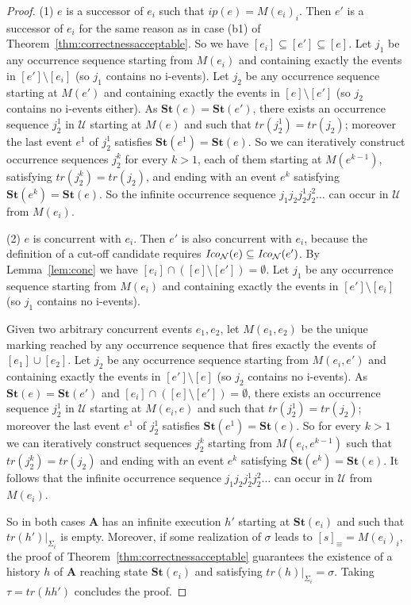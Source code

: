 \documentclass{llncs}
\def\prod{\mathbf{A}}
\def\U{\mathcal{U}}
\def\N{\mathcal{N}}
\newcommand{\st}[1]{\mathbf{St}(#1)}
\newcommand{\Coni}[2]{{\it Ico}_{#1}(#2)}
\def\trace{tr}
\begin{document}
\begin{proof}
(1) $e$ is a successor of $e_i$ such that $ip(e)=M(e_i)_i$.  Then $e'$ is a successor of $e_i$ for the same reason as in case (b1) of Theorem~\ref{thm:correctnessacceptable}. So we have $[e_i]\subseteq[e']\subseteq[e]$.
Let $j_1$ be any occurrence sequence starting from $M(e_i)$ and containing exactly the events in $[e'] \setminus [e_i]$ (so $j_1$ contains no i-events).
Let $j_2$ be any occurrence sequence starting at $M(e')$ and containing exactly the events in $[e]\setminus [e']$ (so $j_2$ contains no i-events either).
As $\st{e}=\st{e'}$, there exists an occurrence sequence $j_2^1$ 
in $\U$ starting at $M(e)$ and such that $\trace(j_2^1)=\trace(j_2)$; moreover the last event $e^1$ of $j_2^1$ satisfies $\st{e^1}=\st{e}$.
So we can iteratively construct occurrence sequences $j_2^k$ for every $k>1$, each of them starting at $M(e^{k-1})$, satisfying $\trace(j_2^k)=\trace(j_2)$, 
and ending with an event $e^k$ satisfying $\st{e^k}=\st{e}$.
So the infinite occurrence sequence $j_1j_2j_2^1j_2^2\dots$ can occur in $\U$ from $M(e_i)$.

(2) $e$ is concurrent with $e_i$.  Then $e'$ is also concurrent with $e_i$, because the definition of a cut-off candidate requires $\Coni{\N}{e}\subseteq\Coni{\N}{e'}$. By Lemma~\ref{lem:conc} we have $[e_i]\cap([e]\setminus[e'])=\emptyset$. Let $j_1$ be any occurrence sequence starting from $M(e_i)$ and containing exactly the events in $[e'] \setminus [e_i]$ (so $j_1$ contains no i-events).

Given two arbitrary concurrent events $e_1, e_2$, let $M(e_1,e_2)$ be the unique marking reached by any occurrence sequence that fires exactly the events of $[e_1]\cup[e_2]$. Let $j_2$ be any occurrence sequence starting from $M(e_i,e')$ and containing exactly the events in $[e']\setminus [e]$ (so $j_2$ contains no i-events).
As $\st{e}=\st{e'}$ and $[e_i]\cap([e]\setminus[e'])=\emptyset$, there exists  an occurrence sequence $j_2^1$ in $\U$ starting at $M(e_i,e)$ and such that $\trace(j_2^1)=\trace(j_2)$; moreover the last event $e^1$ of $j_2^1$ satisfies $\st{e^1}=\st{e}$. So for every $k > 1$ we can iteratively
construct sequences $j_2^k$ starting from $M(e_i,e^{k-1})$ such that $\trace(j_2^k)=\trace(j_2)$ and ending with an event $e^k$ satisfying $\st{e^k}=\st{e}$. It follows that the infinite occurrence sequence $j_1j_2j_2^1j_2^2\dots$ can occur in $\U$ from $M(e_i)$.

So in both cases $\prod$ has an infinite execution $h'$ starting at $\st{e_i}$ and such that $\trace(h')|_{\Sigma_i}$ is empty.
Moreover, if some realization of $\sigma$ leads to $[s]_\equiv=M(e_i)_i$, the proof of Theorem~\ref{thm:correctnessacceptable} guarantees the existence of a history $h$ of $\prod$ reaching state $\st{e_i}$ and satisfying $\trace(h)|_{\Sigma_i}=\sigma$.
Taking $\tau=\trace(hh')$ concludes the proof.
\end{proof}
\end{document}
